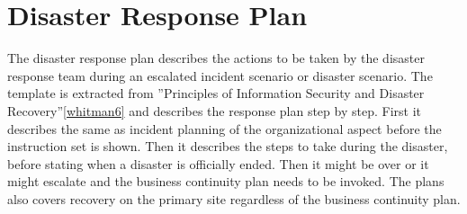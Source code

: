 \section{Disaster Response Plan}
The disaster response plan describes the actions to be taken by the disaster response team during an escalated incident scenario or disaster scenario. The template is extracted from ”Principles of Information Security and Disaster Recovery”\ref{whitman6} and describes the response plan step by step. First it describes the same as incident planning of the organizational aspect before the instruction set is shown. Then it describes the steps to take during the disaster, before stating when a disaster is officially ended. Then it might be over or it might escalate and the business continuity plan needs to be invoked. The plans also covers recovery on the primary site regardless of the business continuity plan.
